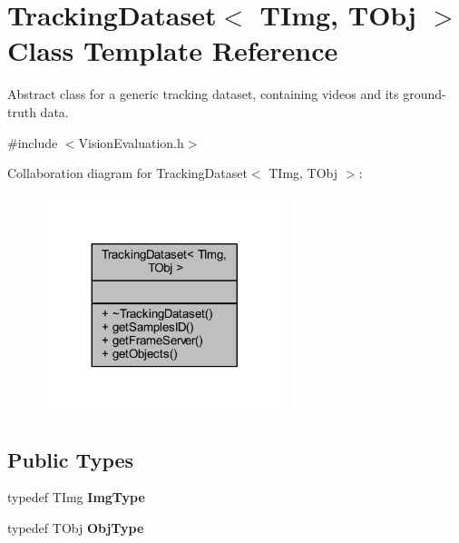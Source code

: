 \hypertarget{class_vision_core_1_1_evaluation_1_1_tracking_dataset}{}\section{Tracking\+Dataset$<$ T\+Img, T\+Obj $>$ Class Template Reference}
\label{class_vision_core_1_1_evaluation_1_1_tracking_dataset}


Abstract class for a generic tracking dataset, containing videos and its ground-\/truth data.  




{\ttfamily \#include $<$Vision\+Evaluation.\+h$>$}



Collaboration diagram for Tracking\+Dataset$<$ T\+Img, T\+Obj $>$\+:
\nopagebreak
\begin{figure}[H]
\begin{center}
\leavevmode
\includegraphics[width=200pt]{class_vision_core_1_1_evaluation_1_1_tracking_dataset__coll__graph}
\end{center}
\end{figure}
\subsection*{Public Types}
\begin{DoxyCompactItemize}
\item 
\hypertarget{class_vision_core_1_1_evaluation_1_1_tracking_dataset_aaafe8051ac78bd4d8ed3027acd24a1c0}{}typedef T\+Img {\bfseries Img\+Type}\label{class_vision_core_1_1_evaluation_1_1_tracking_dataset_aaafe8051ac78bd4d8ed3027acd24a1c0}

\item 
\hypertarget{class_vision_core_1_1_evaluation_1_1_tracking_dataset_a34f8ad85716743523e520af46032716e}{}typedef T\+Obj {\bfseries Obj\+Type}\label{class_vision_core_1_1_evaluation_1_1_tracking_dataset_a34f8ad85716743523e520af46032716e}

\end{DoxyCompactItemize}
